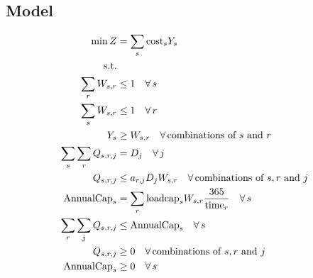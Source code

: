 \documentclass[10pt]{article}
\begin{document}
\subsection{Model}
\begin{align}
    \min Z &= \sum_s\text{cost}_sY_s\notag\\
    \text{s.t.}\notag\\
    \sum_r W_{s, r} &\le 1 \quad\forall\, s\\
    \sum_s W_{s, r} &\le 1 \quad\forall\, r\\
    Y_s &\ge W_{s, r}\quad\forall\,\text{combinations of $s $ and $r $}\\
    \sum_s\sum_rQ_{s, r, j} &= D_j \quad\forall\, j\\
    Q_{s, r, j} &\le a_{r, j}D_jW_{s, r}\quad\forall\,\text{combinations of $s, r $ and $j $}\\
    \text{AnnualCap}_s &= \sum_r\text{loadcap}_sW_{s, r}\frac{365}{\text{time}_r}\quad\forall\, s\\
    \sum_r\sum_jQ_{s, r, j} &\le \text{AnnualCap}_s\quad\forall\, s\\
    Q_{s, r, j} &\ge 0 \quad\forall\,\text{combinations of $s, r $ and $j $}\\
    \text{AnnualCap}_s &\ge 0 \quad\forall\, s
\end{align}
\end{document}
